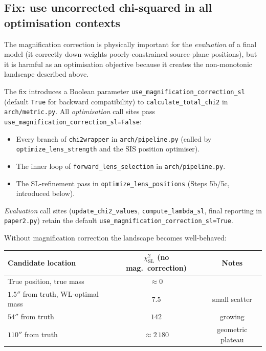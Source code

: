 \documentclass[12pt]{article}
\begin{document}
\subsection{Fix: use uncorrected chi-squared in all optimisation contexts}

The magnification correction is physically important for the \emph{evaluation} of a
final model (it correctly down-weights poorly-constrained source-plane positions), but
it is harmful as an optimisation objective because it creates the non-monotonic
landscape described above.

The fix introduces a Boolean parameter
\texttt{use\_magnification\_correction\_sl} (default \texttt{True} for backward
compatibility) to \texttt{calculate\_total\_chi2} in \texttt{arch/metric.py}.  All
\emph{optimisation} call sites pass \texttt{use\_magnification\_correction\_sl=False}:

\begin{itemize}[noitemsep]
  \item Every branch of \texttt{chi2wrapper} in \texttt{arch/pipeline.py}
        (called by \texttt{optimize\_lens\_strength} and the SIS position optimiser).
  \item The inner loop of \texttt{forward\_lens\_selection} in
        \texttt{arch/pipeline.py}.
  \item The SL-refinement pass in \texttt{optimize\_lens\_positions} (Steps 5b/5c,
        introduced below).
\end{itemize}

\textit{Evaluation} call sites (\texttt{update\_chi2\_values}, \texttt{compute\_lambda\_sl},
final reporting in \texttt{paper2.py}) retain the default
\texttt{use\_magnification\_correction\_sl=True}.

Without magnification correction the landscape becomes well-behaved:

\begin{center}
\begin{tabular}{lcc}
  \toprule
  Candidate location & $\chi^2_\mathrm{SL}$ (no mag.\ correction) & Notes\\
  \midrule
  True position, true mass & $\approx 0$ & \\
  $1.5''$ from truth, WL-optimal mass & $7.5$ & small scatter\\
  $54''$ from truth & $142$ & growing\\
  $110''$ from truth & $\approx 2\,180$ & geometric plateau\\
  \bottomrule
\end{tabular}
\end{center}
\end{document}
